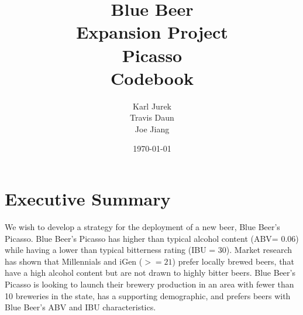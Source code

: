 \documentclass{report}
\title{Blue Beer\\
 Expansion Project\\
  Picasso\\
 \textbf{Codebook}}
\author{Karl Jurek\\
Travis Daun\\
Joe Jiang}
\date{\today}
\begin{document}

\maketitle{}

\tableofcontents{}


\chapter{Executive Summary}
\label{cha:executive-summary}

We wish to develop a strategy for the deployment of a new beer, Blue Beer's Picasso.
Blue Beer's Picasso has higher than typical alcohol content (ABV= 0.06) while having
a lower than typical bitterness rating (IBU = 30). Market research has shown that Millennials and iGen ($>=21$) prefer locally brewed beers, that have a high alcohol content but are not drawn to highly bitter beers. Blue Beer's Picasso is looking to launch their brewery production in an area with fewer than 10 breweries in the state, has a supporting demographic, and prefers beers  with Blue Beer's ABV and IBU characteristics.\\
\end{document}
